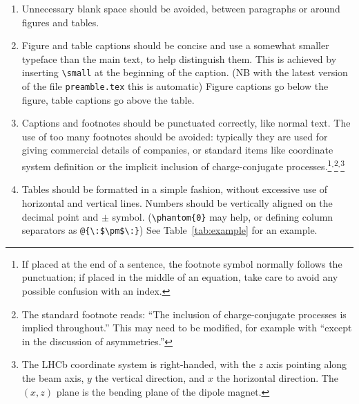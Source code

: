 \begin{enumerate}

\item Unnecessary blank space should be avoided, between paragraphs or
  around figures and tables.

\item Figure and table captions should be concise and use a somewhat smaller typeface
  than the main text, to help distinguish them. This is achieved by 
  inserting \verb!\small! at the beginning of the caption.
  (NB with the latest version of the file \verb!preamble.tex! this is automatic)
  Figure captions go below the figure, table captions go above the
  table.

\item Captions and footnotes should be punctuated correctly, like
  normal text. The use of too many footnotes should be avoided:
  typically they are used for giving commercial details of companies,
  or standard items like coordinate system definition or the implicit
  inclusion of charge-conjugate processes.\footnote{If placed at the end
    of a sentence, the footnote symbol normally follows the
    punctuation; if placed in the middle of an equation, take care to
    avoid any possible confusion with an index.}$^,$\footnote{The standard footnote reads: ``The inclusion of charge-conjugate processes is implied
    throughout.'' This may need to be modified, for example with ``except in the discussion of asymmetries.''}$^,$\footnote{The LHCb coordinate system is right-handed, with the $z$ axis pointing along the
beam axis, $y$ the vertical direction, and $x$ the horizontal direction. The $(x, z)$ plane is the bending plane
of the dipole magnet.}

\item Tables should be formatted in a simple fashion, without
  excessive use of horizontal and vertical lines.
  Numbers should be vertically aligned on the decimal point and $\pm$ symbol.
  (\verb!\phantom{0}! may help, or defining column separators as \verb!@{\:$\pm$\:}!)
  See Table~\ref{tab:example} for an example. 



\end{enumerate}
